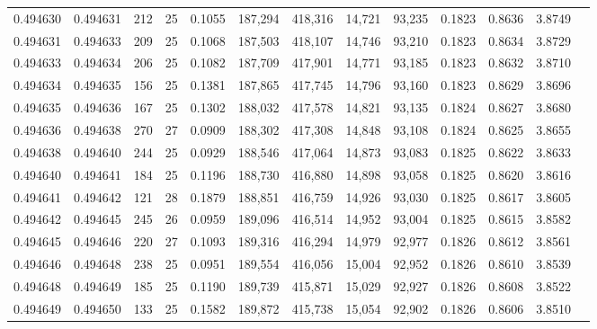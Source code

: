 \begin{tabular}{rrrrrrrrrrrrr}
0.494630 & 0.494631 & 212 &  25 &                                     0.1055 & 187,294 & 418,316 &  14,721 &  93,235 & 0.1823 & 0.8636 & 3.8749 \\
0.494631 & 0.494633 & 209 &  25 &                                     0.1068 & 187,503 & 418,107 &  14,746 &  93,210 & 0.1823 & 0.8634 & 3.8729 \\
0.494633 & 0.494634 & 206 &  25 &                                     0.1082 & 187,709 & 417,901 &  14,771 &  93,185 & 0.1823 & 0.8632 & 3.8710 \\
0.494634 & 0.494635 & 156 &  25 &                                     0.1381 & 187,865 & 417,745 &  14,796 &  93,160 & 0.1823 & 0.8629 & 3.8696 \\
0.494635 & 0.494636 & 167 &  25 &                                     0.1302 & 188,032 & 417,578 &  14,821 &  93,135 & 0.1824 & 0.8627 & 3.8680 \\
0.494636 & 0.494638 & 270 &  27 &                                     0.0909 & 188,302 & 417,308 &  14,848 &  93,108 & 0.1824 & 0.8625 & 3.8655 \\
0.494638 & 0.494640 & 244 &  25 &                                     0.0929 & 188,546 & 417,064 &  14,873 &  93,083 & 0.1825 & 0.8622 & 3.8633 \\
0.494640 & 0.494641 & 184 &  25 &                                     0.1196 & 188,730 & 416,880 &  14,898 &  93,058 & 0.1825 & 0.8620 & 3.8616 \\
0.494641 & 0.494642 & 121 &  28 &                                     0.1879 & 188,851 & 416,759 &  14,926 &  93,030 & 0.1825 & 0.8617 & 3.8605 \\
0.494642 & 0.494645 & 245 &  26 &                                     0.0959 & 189,096 & 416,514 &  14,952 &  93,004 & 0.1825 & 0.8615 & 3.8582 \\
0.494645 & 0.494646 & 220 &  27 &                                     0.1093 & 189,316 & 416,294 &  14,979 &  92,977 & 0.1826 & 0.8612 & 3.8561 \\
0.494646 & 0.494648 & 238 &  25 &                                     0.0951 & 189,554 & 416,056 &  15,004 &  92,952 & 0.1826 & 0.8610 & 3.8539 \\
0.494648 & 0.494649 & 185 &  25 &                                     0.1190 & 189,739 & 415,871 &  15,029 &  92,927 & 0.1826 & 0.8608 & 3.8522 \\
0.494649 & 0.494650 & 133 &  25 &                                     0.1582 & 189,872 & 415,738 &  15,054 &  92,902 & 0.1826 & 0.8606 & 3.8510 \\

\end{tabular}
